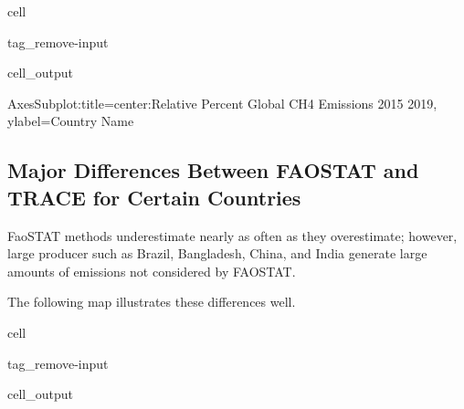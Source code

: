 \documentclass[letterpaper,10pt,english]{jupyterBook}
\begin{document}
\begin{sphinxuseclass}{cell}
\begin{sphinxuseclass}{tag_remove-input}\begin{sphinxVerbatimOutput}

\begin{sphinxuseclass}{cell_output}
\begin{sphinxVerbatim}[commandchars=\\\{\}]
\PYGZlt{}AxesSubplot:title=\PYGZob{}\PYGZsq{}center\PYGZsq{}:\PYGZsq{}Relative Percent Global CH4 Emissions 2015 \PYGZhy{} 2019\PYGZsq{}\PYGZcb{}, ylabel=\PYGZsq{}Country Name\PYGZsq{}\PYGZgt{}
\end{sphinxVerbatim}

\noindent{}

\end{sphinxuseclass}\end{sphinxVerbatimOutput}

\end{sphinxuseclass}
\end{sphinxuseclass}

\subsection{Major Differences Between FAOSTAT and TRACE for Certain Countries}
\label{\detokenize{notebooks/hidden_post:major-differences-between-faostat-and-trace-for-certain-countries}}
\sphinxAtStartPar
FaoSTAT methods underestimate nearly as often as they overestimate; however, large producer such as Brazil, Bangladesh, China, and India generate large amounts of emissions not considered by FAOSTAT.

\sphinxAtStartPar
The following map illustrates these differences well.

\begin{sphinxuseclass}{cell}
\begin{sphinxuseclass}{tag_remove-input}\begin{sphinxVerbatimOutput}

\begin{sphinxuseclass}{cell_output}
\noindent{}

\end{sphinxuseclass}\end{sphinxVerbatimOutput}

\end{sphinxuseclass}
\end{sphinxuseclass}
\end{document}
